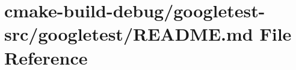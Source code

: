 \hypertarget{cmake-build-debug_2googletest-src_2googletest_2README_8md}{}\section{cmake-\/build-\/debug/googletest-\/src/googletest/\+R\+E\+A\+D\+ME.md File Reference}
\label{cmake-build-debug_2googletest-src_2googletest_2README_8md}
